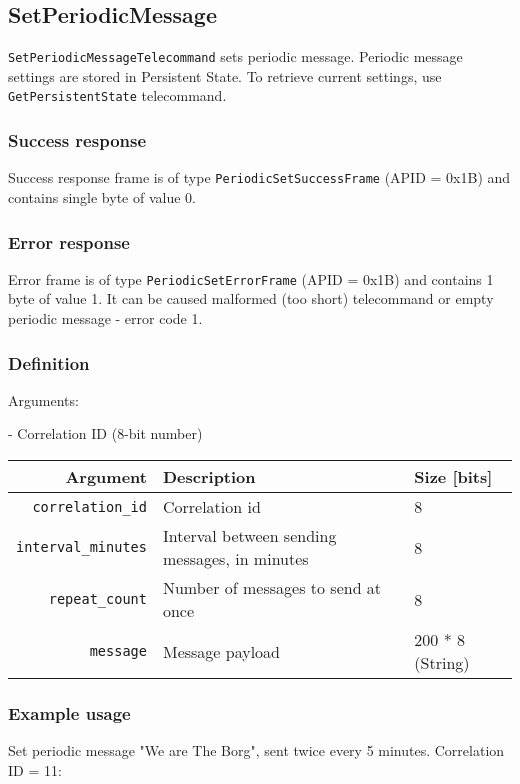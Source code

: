 \subsection{SetPeriodicMessage}
\texttt{SetPeriodicMessageTelecommand} sets periodic message. Periodic message settings are stored in Persistent State. To retrieve current settings, use \texttt{GetPersistentState} telecommand. 

\subsubsection{Success response}
Success response frame is of type \texttt{PeriodicSetSuccessFrame} (APID = 0x1B) and contains single byte of value 0.

\subsubsection{Error response}
Error frame is of type \texttt{PeriodicSetErrorFrame} (APID = 0x1B) and contains 1 byte of value 1. It can be caused malformed (too short) telecommand or empty periodic message - error code 1.

\subsubsection{Definition}

Arguments: 
\begin{description}[labelindent=1cm]
	\item[\texttt{correlation\_id}] - Correlation ID (8-bit number)
\end{description}

\begin{tabular}{r | p{10cm} | l}
    Argument                    & Description               & Size [bits] \\
    \hline
    \texttt{correlation\_id}    & Correlation id            & 8 \\
    \texttt{interval\_minutes}   & Interval between sending messages, in minutes & 8 \\
    \texttt{repeat\_count}       & Number of messages to send at once & 8 \\
    \texttt{message}            & Message payload & 200 * 8 (String) \\
\end{tabular}

\subsubsection{Example usage}
Set periodic message "We are The Borg", sent twice every 5 minutes. Correlation ID = 11:

